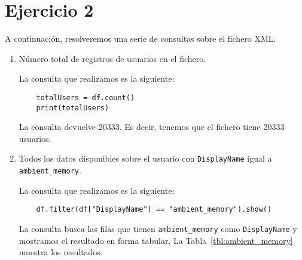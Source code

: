 \documentclass[12pt,a4paper,twoside,openright,titlepage,final]{article}
\begin{document}
\section{Ejercicio 2}
A continuación, resolveremos una serie de consultas sobre el fichero XML.

\begin{enumerate}
	\item Número total de registros de usuarios en el fichero.
	
	La consulta que realizamos es la siguiente:
	
	\begin{verbatim}
	totalUsers = df.count()
	print(totalUsers)
	\end{verbatim}
	
	La consulta devuelve 20333. Es decir, tenemos que el fichero tiene 20333 usuarios.
	
	\item Todos los datos disponibles sobre el usuario con \texttt{DisplayName} igual a \texttt{ambient\_memory}.
	
	La consulta que realizamos es la siguiente:
	
	\begin{verbatim}
	df.filter(df["DisplayName"] == "ambient_memory").show()
	\end{verbatim}
	
	La consulta busca las filas que tienen \texttt{ambient\_memory} como \texttt{DisplayName} y mostramos el resultado en forma tabular. La Tabla~\ref{tbl:ambient_memory} muestra los resultados.
	

\end{enumerate}
\end{document}
